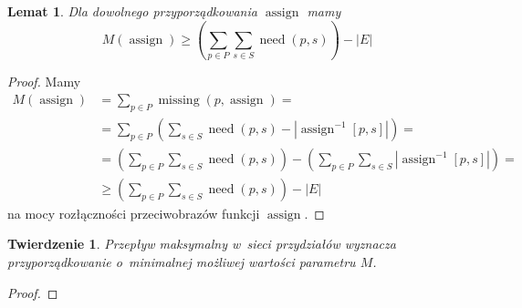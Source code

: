 \documentclass[12pt,a4paper]{article}
\newtheorem{lem}{Lemat}
\newtheorem{thm}{Twierdzenie}
\theoremstyle{definition}
\DeclareMathOperator{\need}{need}
\DeclareMathOperator{\assign}{assign}
\DeclareMathOperator{\missing}{missing}
\begin{document}
\begin{lem}
Dla dowolnego przyporządkowania $\assign$ mamy
$$ M(\assign) \geq \left( \sum_{p \in P} \sum_{s \in S} \need(p,s) \right)
- |E| $$
\end{lem}

\begin{proof}
Mamy
\begin{align*}
M(\assign) &= \sum_{p \in P} \missing(p, \assign) = \\
&= \sum_{p \in P} \left( \sum_{s \in S} \need(p,s) -
\left| \assign^{-1}[p,s] \right| \right) = \\
&= \left( \sum_{p \in P} \sum_{s \in S} \need(p,s) \right) -
\left(\sum_{p \in P} \sum_{s \in S} \left| \assign^{-1}[p,s] \right|\right) = \\
&\geq \left( \sum_{p \in P} \sum_{s \in S} \need(p,s) \right) - |E|
\end{align*}
na mocy rozłączności przeciwobrazów funkcji $\assign$.
\end{proof}

\begin{thm}
Przepływ maksymalny w~sieci przydziałów wyznacza przyporządkowanie o~minimalnej
możliwej wartości parametru $M$. 
\end{thm}

\begin{proof}
\end{proof}
\end{document}
